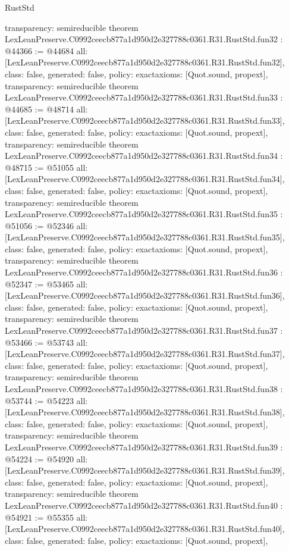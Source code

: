 \begin{lexlean}{RustStd}
\begin{coremodule}
{  transparency: semireducible
}
theorem LexLeanPreserve.C0992ceecb877a1d950d2e327788c0361.R31.RustStd.fun32 : @44366 := @44684 {
  all: [LexLeanPreserve.C0992ceecb877a1d950d2e327788c0361.R31.RustStd.fun32],
  class: false,
  generated: false,
  policy: exact{axioms: [Quot.sound, propext]},
  transparency: semireducible
}
theorem LexLeanPreserve.C0992ceecb877a1d950d2e327788c0361.R31.RustStd.fun33 : @44685 := @48714 {
  all: [LexLeanPreserve.C0992ceecb877a1d950d2e327788c0361.R31.RustStd.fun33],
  class: false,
  generated: false,
  policy: exact{axioms: [Quot.sound, propext]},
  transparency: semireducible
}
theorem LexLeanPreserve.C0992ceecb877a1d950d2e327788c0361.R31.RustStd.fun34 : @48715 := @51055 {
  all: [LexLeanPreserve.C0992ceecb877a1d950d2e327788c0361.R31.RustStd.fun34],
  class: false,
  generated: false,
  policy: exact{axioms: [Quot.sound, propext]},
  transparency: semireducible
}
theorem LexLeanPreserve.C0992ceecb877a1d950d2e327788c0361.R31.RustStd.fun35 : @51056 := @52346 {
  all: [LexLeanPreserve.C0992ceecb877a1d950d2e327788c0361.R31.RustStd.fun35],
  class: false,
  generated: false,
  policy: exact{axioms: [Quot.sound, propext]},
  transparency: semireducible
}
theorem LexLeanPreserve.C0992ceecb877a1d950d2e327788c0361.R31.RustStd.fun36 : @52347 := @53465 {
  all: [LexLeanPreserve.C0992ceecb877a1d950d2e327788c0361.R31.RustStd.fun36],
  class: false,
  generated: false,
  policy: exact{axioms: [Quot.sound, propext]},
  transparency: semireducible
}
theorem LexLeanPreserve.C0992ceecb877a1d950d2e327788c0361.R31.RustStd.fun37 : @53466 := @53743 {
  all: [LexLeanPreserve.C0992ceecb877a1d950d2e327788c0361.R31.RustStd.fun37],
  class: false,
  generated: false,
  policy: exact{axioms: [Quot.sound, propext]},
  transparency: semireducible
}
theorem LexLeanPreserve.C0992ceecb877a1d950d2e327788c0361.R31.RustStd.fun38 : @53744 := @54223 {
  all: [LexLeanPreserve.C0992ceecb877a1d950d2e327788c0361.R31.RustStd.fun38],
  class: false,
  generated: false,
  policy: exact{axioms: [Quot.sound, propext]},
  transparency: semireducible
}
theorem LexLeanPreserve.C0992ceecb877a1d950d2e327788c0361.R31.RustStd.fun39 : @54224 := @54920 {
  all: [LexLeanPreserve.C0992ceecb877a1d950d2e327788c0361.R31.RustStd.fun39],
  class: false,
  generated: false,
  policy: exact{axioms: [Quot.sound, propext]},
  transparency: semireducible
}
theorem LexLeanPreserve.C0992ceecb877a1d950d2e327788c0361.R31.RustStd.fun40 : @54921 := @55355 {
  all: [LexLeanPreserve.C0992ceecb877a1d950d2e327788c0361.R31.RustStd.fun40],
  class: false,
  generated: false,
  policy: exact{axioms: [Quot.sound, propext]},
}
\end{coremodule}
\end{lexlean}
